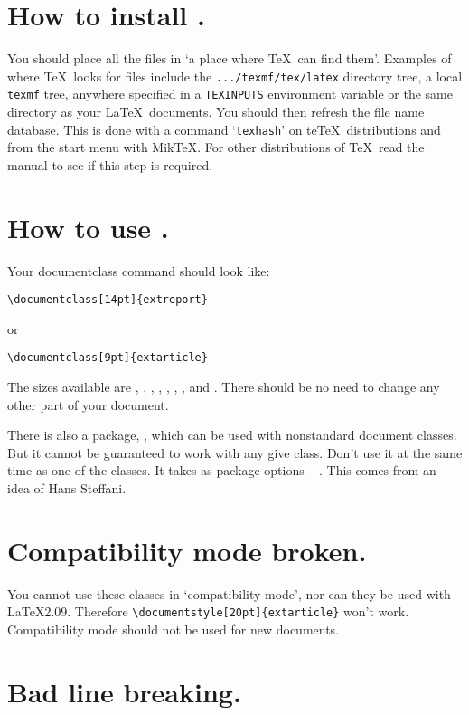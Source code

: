\section{How to install .}

You should place all the files in `a place where \TeX\ can find them'.
Examples of where \TeX\ looks for files include the \texttt{.../texmf/tex/latex}
directory tree, a local \texttt{texmf} tree, anywhere specified in a \texttt{TEXINPUTS}
environment variable or the same directory as your \LaTeX\ documents.  
You should then refresh the file name database. This is done with a
command `\texttt{texhash}' on te\TeX\ distributions and from the start menu with
Mik\TeX\@.   For other distributions of \TeX\ read the manual to see if this
step is required.


\section{How to use .}

Your documentclass command should look like:
%
\begin{verbatim}
\documentclass[14pt]{extreport}
\end{verbatim}
%
or
%
\begin{verbatim}
\documentclass[9pt]{extarticle}
\end{verbatim}
%
The sizes available are \opt{8pt}, \opt{9pt}, \opt{10pt}, \opt{11pt}, \opt{12pt}, \opt{14pt}, \opt{17pt}, and \opt{20pt}.
There should be no need to change any other part of your document.

There is also a package, , which can be used with
nonstandard document classes.  But it cannot be guaranteed to work with
any give class.  Don't use it at the same time as one of the 
classes. It takes as package options \opt{8pt}\,--\,\opt{20pt}.  This comes from an idea
of Hans Steffani.


\section{Compatibility mode broken.}

You cannot use these classes in `compatibility mode', nor can they be
used with \LaTeX2.09.  Therefore \verb+\documentstyle[20pt]{extarticle}+ won't
work.  Compatibility mode should not be used for new documents.


\section{Bad line breaking.}

